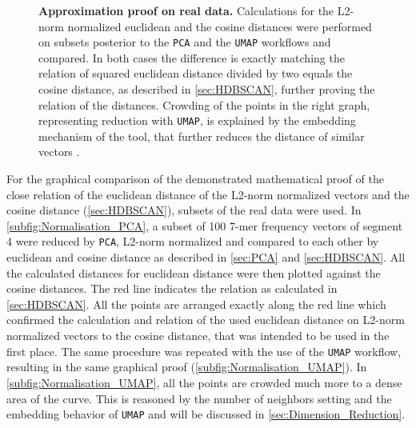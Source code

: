 \begin{figure}[!hbt]
\begin{subfigure}[b]{0.475\textwidth}
    \end{subfigure}
    \caption[Approximation proof on real data]{\textbf{Approximation proof on real data.} Calculations for the L2-norm normalized euclidean and the cosine distances were performed on subsets posterior to the \texttt{PCA} and the \texttt{UMAP} workflows and compared. In both cases the difference is exactly matching the relation of squared euclidean distance divided by two equals the cosine distance, as described in \autoref{sec:HDBSCAN}, further proving the relation of the distances. Crowding of the points in the right graph, representing reduction with \texttt{UMAP}, is explained by the embedding mechanism of the tool, that further reduces the distance of similar vectors \autocite{mcinnes_umap_2020}.}
    \label{fig:Normalisation_Methods}
\end{figure}

\vspace{1em}

For the graphical comparison of the demonstrated mathematical proof of the close relation of the euclidean distance of the L2-norm normalized vectors and the cosine distance (\autoref{sec:HDBSCAN}), subsets of the real data were used. In \autoref{subfig:Normalisation_PCA}, a subset of 100 7-mer frequency vectors of segment 4 were reduced by \texttt{PCA}, L2-norm normalized and compared to each other by euclidean and cosine distance as described in \autoref{sec:PCA} and \autoref{sec:HDBSCAN}. All the calculated distances for euclidean distance were then plotted against the cosine distances. The red line indicates the relation as calculated in \autoref{sec:HDBSCAN}. All the points are arranged exactly along the red line which confirmed the calculation and relation of the used euclidean distance on L2-norm normalized vectors to the cosine distance, that was intended to be used in the first place. The same procedure was repeated with the use of the \texttt{UMAP} workflow, resulting in the same graphical proof (\autoref{subfig:Normalisation_UMAP}). In \autoref{subfig:Normalisation_UMAP}, all the points are crowded much more to a dense area of the curve. This is reasoned by the number of neighbors setting and the embedding behavior of \texttt{UMAP} and will be discussed in \autoref{sec:Dimension_Reduction}.











